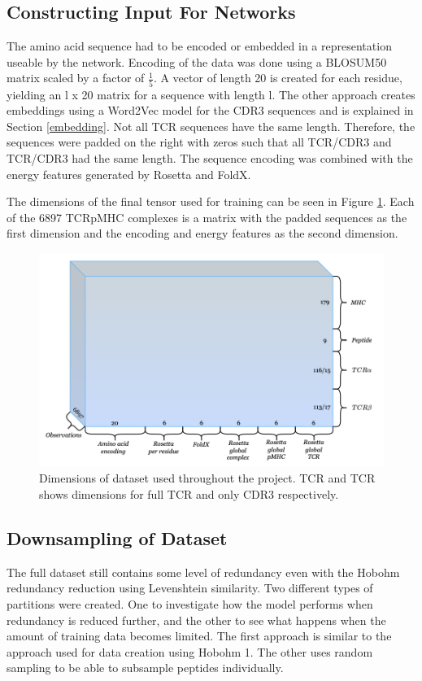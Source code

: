 \subsection{Constructing Input For Networks}

The amino acid sequence had to be encoded or embedded in a representation useable by the network. Encoding of the data was done using a BLOSUM50 matrix scaled by a factor of $\frac{1}{5}$. A vector of length 20 is created for each residue, yielding an l x 20 matrix for a sequence with length l. The other approach creates embeddings using a Word2Vec model for the CDR3 sequences and is explained in Section \ref{embedding}. Not all TCR sequences have the same length. Therefore, the sequences were padded on the right with zeros such that all TCR{\textalpha}/CDR3{\textalpha} and TCR{\textbeta}/CDR3{\textbeta} had the same length. The sequence encoding was combined with the energy features generated by Rosetta and FoldX.

The dimensions of the final tensor used for training can be seen in Figure \ref{fig:data_tensor}. Each of the 6897 TCRpMHC complexes is a matrix with the padded sequences as the first dimension and the encoding and energy features as the second dimension.
\begin{figure}[H]
    \centering
    \includegraphics{figures/data_figure.png}
    \caption{Dimensions of dataset used throughout the project. TCR{\textalpha} and TCR{\textbeta} shows dimensions for full TCR and only CDR3 respectively.}
    \label{fig:data_tensor}
\end{figure}

\subsection{Downsampling of Dataset}
The full dataset still contains some level of redundancy even with the Hobohm redundancy reduction using Levenshtein similarity. Two different types of partitions were created. One to investigate how the model performs when redundancy is reduced further, and the other to see what happens when the amount of training data becomes limited. The first approach is similar to the approach used for data creation using Hobohm 1. The other uses random sampling to be able to subsample peptides individually.

